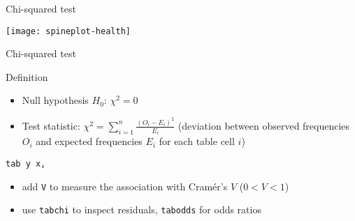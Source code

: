 \documentclass[t]{beamer}
\begin{document}
	\begin{frame}[c]{Chi-squared test}

		\texttt{[image: spineplot-health]}
		
	\end{frame}

	

	\begin{frame}{Chi-squared test}
		
		
		\begin{block}{Definition}
		
			\begin{itemize}
				\item Null hypothesis $H_0$:
				$\chi^2=0$
			
				\item Test statistic:
				$\chi^2=\sum_{i=1}^{n} \frac{(O_i - E_i)^2}{E_i}$ (deviation between observed frequencies $O_i$ and expected frequencies $E_i$ for each table cell $i$)
				
			\end{itemize}

		\end{block}
		
		\begin{block}{\texttt{tab y x, }}

			\begin{itemize}
				\item add \texttt{V} to measure the association with Cramér's $V$ ($0 < V < 1$)
				\item use \texttt{tabchi} to inspect residuals, \texttt{tabodds} for odds ratios
			\end{itemize}

		\end{block}
		
	\end{frame}
	
\end{document}

